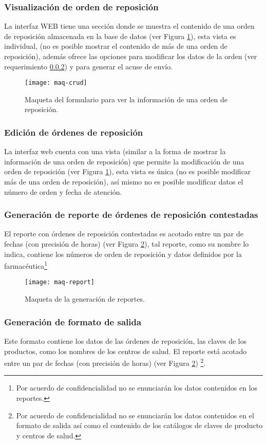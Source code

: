 \subsubsection{Visualización de orden de reposición}
La interfaz WEB tiene una sección donde se muestra el contenido de una orden de reposición almacenada en la base de datos (ver Figura \ref{fig:maq-crud}), esta vista es individual, (no es posible mostrar el contenido de más de una orden de reposición), además ofrece las opciones para modificar los datos de la orden (ver requerimiento \ref{req-edicion}) y para generar el acuse de envío.
\begin{figure}[h]
  \centering
  \texttt{[image: maq-crud]} 
  \caption{Maqueta del formulario para ver la información de una orden de reposición.}
  \label{fig:maq-crud}
\end{figure} 

\subsubsection{Edición de órdenes de reposición}\label{req-edicion}
La interfaz web cuenta con una vista (similar a la forma de mostrar la información de una orden de reposición) que permite la modificación de una orden de reposición (ver Figura \ref{fig:maq-crud}), esta vista es única (no es posible modificar más de una orden de reposición), así mismo no es posible modificar datos el número de orden y fecha de atención.

\subsubsection{Generación de reporte de órdenes de reposición contestadas}
El reporte con órdenes de reposición contestadas es acotado entre un par de fechas (con precisión de horas) (ver Figura \ref{fig:maq-report}), tal reporte, como su nombre lo indica, contiene los números de orden de reposición y datos definidos por la farmacéutica\footnote{Por acuerdo de confidencialidad no se enunciarán los datos contenidos en los reportes.}
\begin{figure}[h]
  \centering
  \texttt{[image: maq-report]} 
  \caption{Maqueta de la generación de reportes.}
  \label{fig:maq-report}
\end{figure} 

\subsubsection{Generación de formato de salida}
Este formato contiene los datos de las órdenes de reposición, las claves de los productos, como los nombres de los centros de salud. El reporte está acotado entre un par de fechas (con precisión de horas) (ver Figura \ref{fig:maq-report}) \footnote{Por acuerdo de confidencialidad no se enunciarán los datos contenidos en el formato de salida así como el contenido de los catálogos de claves de producto y centros de salud.}.

